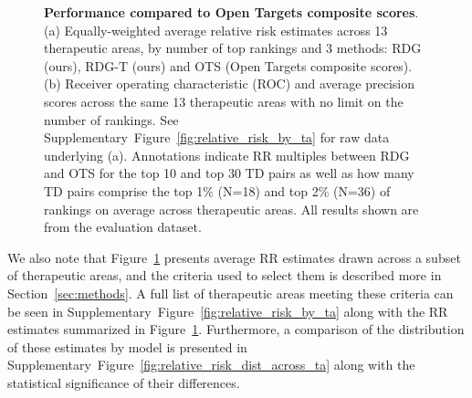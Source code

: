 \documentclass{article}
\begin{document}
\begin{figure}[!htb]
  \centering
  \captionsetup{width=.9\linewidth}
  \captionsetup[subfigure]{labelformat=empty}
  \qquad
  \caption{
    \textbf{Performance compared to Open Targets composite scores}.
    (a) Equally-weighted average relative risk estimates across 13 therapeutic areas, by number of top rankings and 3 methods: RDG (ours), RDG-T (ours) and OTS (Open Targets composite scores). 
    (b) Receiver operating characteristic (ROC) and average precision scores across the same 13 therapeutic areas with no limit on the number of rankings. 
    See Supplementary~Figure~\ref{fig:relative_risk_by_ta} for raw data underlying (a).
    Annotations indicate RR multiples between RDG and OTS for the top 10 and top 30 TD pairs as well as how many TD pairs comprise the top 1\% (N=18) and top 2\% (N=36) of rankings on average across therapeutic areas. All results shown are from the evaluation dataset.
  }
  \label{fig:performance_across_ta}
\end{figure}

We also note that Figure~\ref{fig:performance_across_ta} presents average RR estimates drawn across a subset of therapeutic areas, and the criteria used to select them is described more in Section~\ref{sec:methods}. A full list of therapeutic areas meeting these criteria can be seen in Supplementary~Figure~\ref{fig:relative_risk_by_ta} along with the RR estimates summarized in Figure~\ref{fig:performance_across_ta}. Furthermore, a comparison of the distribution of these estimates by model is presented in Supplementary~Figure~\ref{fig:relative_risk_dist_across_ta} along with the statistical significance of their differences.
\end{document}
